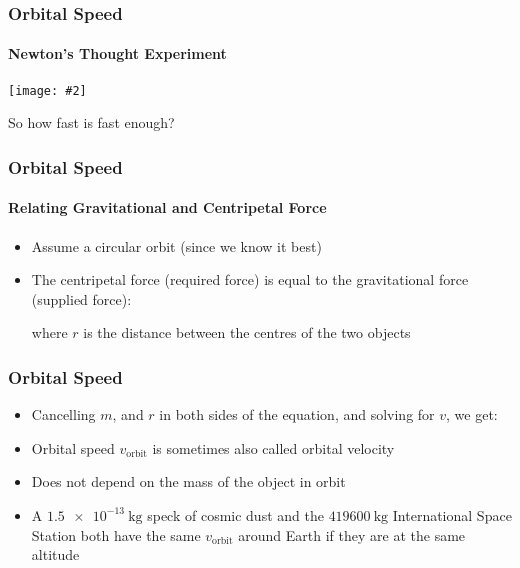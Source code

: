\documentclass[12pt,compress,aspectratio=169]{beamer}
\newcommand{\pic}[2]{\texttt{[image: \#2]}}
\begin{document}
\begin{frame}
  \frametitle{Orbital Speed}
  \framesubtitle{Newton's Thought Experiment}
  \begin{center}
    \pic{1}{figure-5.jpg}
  \end{center}

  \vspace{-.3in}So how fast is fast enough?
\end{frame}


\begin{frame}
  \frametitle{Orbital Speed}
  \framesubtitle{Relating Gravitational and Centripetal Force}
  \begin{itemize}
  \item Assume a circular orbit (since we know it best)
  \item The centripetal force (required force) is equal to the gravitational
    force (supplied force):

    where $r$ is the distance between the centres of the two objects
  \end{itemize}
\end{frame}



\begin{frame}
  \frametitle{Orbital Speed}
  \begin{itemize}
  \item Cancelling $m$, and $r$ in both sides of the equation, and solving for
    $v$, we get:
    
  \item Orbital speed $v_\mathrm{orbit}$ is sometimes also called orbital
    velocity
  \item Does not depend on the mass of the object in orbit
  \item A $\SI{1.5e-13}{\kg}$ speck of cosmic dust and the $\SI{419600}{\kg}$
    International Space Station both have the same $v_\mathrm{orbit}$ around
    Earth if they are at the same altitude
  \end{itemize}
\end{frame}
\end{document}
